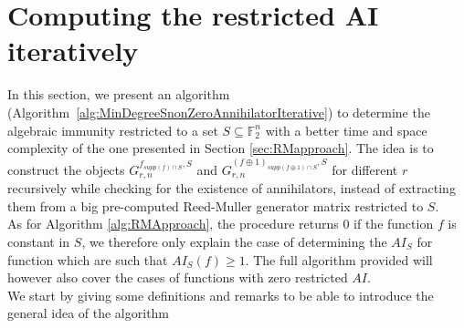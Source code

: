\documentclass[11pt]{llncs}
\begin{document}



\section{Computing the restricted AI iteratively}\label{sec:IterativeApproach}


In this section, we present an algorithm (Algorithm~\ref{alg:MinDegreeSnonZeroAnnihilatorIterative}) to determine the algebraic immunity restricted to a set $S \subseteq \mathbb{F}_2^n$ with a better time and space complexity of the one presented in Section \ref{sec:RMapproach}.
The idea is to construct the objects $G_{r,n}^{f_{supp\left(f\right) \cap S},S}$ and $G_{r,n}^{\left(f\oplus 1\right)_{supp\left(f\oplus 1\right) \cap S},S}$ for different $r$ recursively while checking for the existence of annihilators, instead of extracting them from a big pre-computed Reed-Muller generator matrix restricted to $S$.\\
As for Algorithm \ref{alg:RMApproach}, the procedure returns $0$ if the function $f$ is constant in $S$, we therefore only explain the case of determining the $AI_S$ for function which are such that $AI_S(f) \geq 1$. The full algorithm provided will however also cover the cases of functions with zero restricted $AI$.\\

We start by giving some definitions and remarks to be able to introduce the general idea of the algorithm
\end{document}
